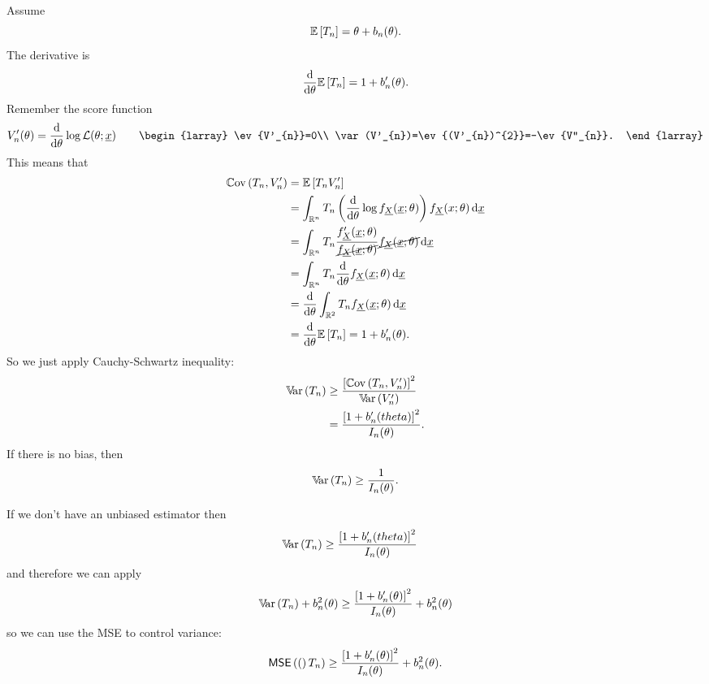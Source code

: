 \documentclass[12pt]{report}
\begin{document}
\begin{fancyproof}
	Assume
	\begin{equation*}
		\mathbb{E}\left[T_n\right]=\theta+b_{n}(\theta).
	\end{equation*}
	The derivative is
	\begin{equation*}
		\frac{\mathop{}\!\mathrm{d}}{\mathop{}\!\mathrm{d}\theta}\mathbb{E}\left[T_{n}\right]=1+b'_{n}(\theta).
	\end{equation*}
	Remember the score function
	\begin{equation*}
		V'_{n}(\theta)=\frac{\dif}{\dif\theta}\log\mathcal{L}(\theta;\ulx)\qquad\begin{larray}
			\ev{V'_{n}}=0\\
			\var(V'_{n})=\ev{(V'_{n})^{2}}=-\ev{V''_{n}}.
		\end{larray}
	\end{equation*}
	This means that
	\begin{align*}
		\cov(T_{n},V'_{n})&=\ev{T_{n}V'_{n}}\\
		&=\int_{\R^{n}}T_{n}\left(\frac{\dif}{\dif\theta}\log f_{\ulX}(\ulx;\theta)\right)f_{\ulX}(x;\theta)\dif\ulx\\
		&=\int_{\R^{n}}T_{n}\frac{f'_{\ulX}(\ulx;\theta)}{\cancel{f_{\ulX}(\ulx;\theta)}}\cancel{f_{\ulX}(\ulx;\theta)}\dif\ulx\\
		&=\int_{\R^{n}}T_{n}\frac{\dif}{\dif\theta}f_{\ulX}(\ulx;\theta)\dif\ulx\\
		&=\frac{\dif}{\dif\theta}\int_{\R^{2}}T_{n}f_{\ulX}(\ulx;\theta)\dif\ulx\\
		&=\deriv{\theta}\ev{T_{n}}=1+b'_{n}(\theta).
	\end{align*}
	So we just apply Cauchy-Schwartz inequality:
	\begin{align*}
		\mathbb{V}\!\mathrm{ar}\,(T_{n})&\geq\frac{\left[\mathbb{C}\mathrm{ov}\,(T_{n},V'_{n})\right]^{2}}{\mathbb{V}\!\mathrm{ar}\,(V'_{n})}\\
		&=\frac{\left[1+b'_{n}(theta)\right]^{2}}{I_{n}(\theta)}.
	\end{align*}
	If there is no bias, then
	\begin{equation*}
		\mathbb{V}\!\mathrm{ar}\,(T_{n})\geq\frac{1}{I_{n}(\theta)}.
	\end{equation*}
\end{fancyproof}
\begin{remark}
	If we don't have an unbiased estimator then
		\begin{align*}
		\mathbb{V}\!\mathrm{ar}\,(T_{n})&\geq\frac{\left[1+b'_{n}(theta)\right]^{2}}{I_{n}(\theta)}
	\end{align*}
	and therefore we can apply
	\begin{align*}
		\mathbb{V}\!\mathrm{ar}\,(T_{n})+b^{2}_{n}(\theta)\geq\frac{\left[1+b'_{n}(\theta)\right]^{2}}{I_{n}(\theta)}+b^{2}_{n}(\theta)
	\end{align*}
	so we can use the MSE to control variance:
	\begin{equation*}
		\mathsf{MSE}\left((\right)T_{n})\geq\frac{\left[1+b'_{n}(\theta)\right]^{2}}{I_{n}(\theta)}+b^{2}_{n}(\theta).
	\end{equation*}
\end{remark}
\end{document}

